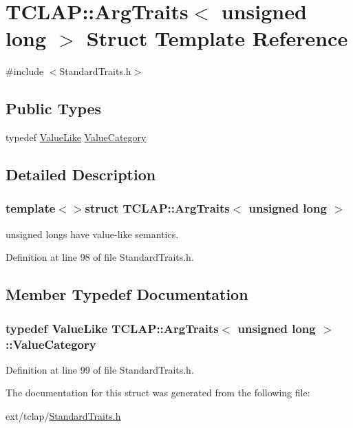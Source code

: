 \hypertarget{struct_t_c_l_a_p_1_1_arg_traits_3_01unsigned_01long_01_4}{}\section{T\+C\+L\+A\+P\+:\+:Arg\+Traits$<$ unsigned long $>$ Struct Template Reference}
\label{struct_t_c_l_a_p_1_1_arg_traits_3_01unsigned_01long_01_4}


{\ttfamily \#include $<$Standard\+Traits.\+h$>$}

\subsection*{Public Types}
\begin{DoxyCompactItemize}
\item 
typedef \hyperlink{struct_t_c_l_a_p_1_1_value_like}{Value\+Like} \hyperlink{struct_t_c_l_a_p_1_1_arg_traits_3_01unsigned_01long_01_4_aa6aeb6243e6fbf8b5aba659083baa1ac}{Value\+Category}
\end{DoxyCompactItemize}


\subsection{Detailed Description}
\subsubsection*{template$<$$>$struct T\+C\+L\+A\+P\+::\+Arg\+Traits$<$ unsigned long $>$}

unsigned longs have value-\/like semantics. 

Definition at line 98 of file Standard\+Traits.\+h.



\subsection{Member Typedef Documentation}
\hypertarget{struct_t_c_l_a_p_1_1_arg_traits_3_01unsigned_01long_01_4_aa6aeb6243e6fbf8b5aba659083baa1ac}{}
\subsubsection[{Value\+Category}]{\setlength{\rightskip}{0pt plus 5cm}typedef {\bf Value\+Like} {\bf T\+C\+L\+A\+P\+::\+Arg\+Traits}$<$ unsigned long $>$\+::{\bf Value\+Category}}\label{struct_t_c_l_a_p_1_1_arg_traits_3_01unsigned_01long_01_4_aa6aeb6243e6fbf8b5aba659083baa1ac}


Definition at line 99 of file Standard\+Traits.\+h.



The documentation for this struct was generated from the following file\+:\begin{DoxyCompactItemize}
\item 
ext/tclap/\hyperlink{_standard_traits_8h}{Standard\+Traits.\+h}\end{DoxyCompactItemize}
